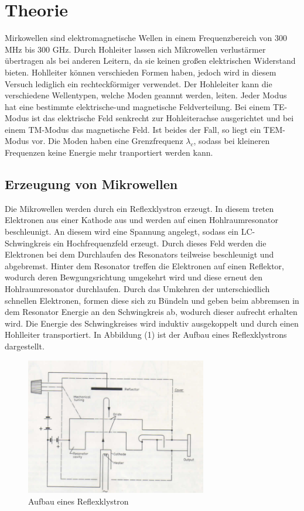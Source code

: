 \section{Theorie}
\label{sec:Theorie}
Mirkowellen sind elektromagnetische Wellen in einem Frequenzbereich von $300$ MHz bis 300 GHz. Durch
Hohleiter lassen sich Mikrowellen verlustärmer übertragen als bei anderen Leitern, da
sie keinen großen elektrischen Widerstand bieten. Hohlleiter können verschieden Formen haben,
jedoch wird in diesem Versuch lediglich ein rechteckförmiger verwendet. Der Hohleleiter
kann die verschiedene Wellentypen, welche Moden geannnt werden, leiten. Jeder Modus hat
eine bestimmte elektrische-und magnetische Feldverteilung. Bei einem TE-Modus ist das elektrische
Feld senkrecht zur Hohleiterachse ausgerichtet und bei einem TM-Modus das magnetische Feld.
Ist beides der Fall, so liegt ein TEM-Modus vor. Die Moden haben eine Grenzfrequenz $\lambda_c$, sodass
bei kleineren Frequenzen keine Energie mehr tranportiert werden kann.

\subsection{Erzeugung von Mikrowellen}
Die Mikrowellen werden durch ein Reflexklystron erzeugt. In diesem treten Elektronen
aus einer Kathode aus und werden auf einen Hohlraumresonator beschleunigt. An diesem
wird eine Spannung angelegt, sodass ein LC-Schwingkreis ein Hochfrequenzfeld erzeugt.
Durch dieses Feld werden die Elektronen  bei dem Durchlaufen des Resonators teilweise beschleunigt und abgebremst.
Hinter dem Resonator treffen die Elektronen auf einen Reflektor, wodurch deren
Bewgungsrichtung umgekehrt wird und diese erneut den Hohlraumresonator durchlaufen.
Durch das Umkehren der unterschiedlich schnellen Elektronen, formen diese sich zu Bündeln und
geben beim abbremsen in dem Resonator Energie an den Schwingkreis ab, wodurch dieser
aufrecht erhalten wird. Die Energie des Schwingkreises wird induktiv ausgekoppelt und
durch einen Hohlleiter transportiert. In Abbildung (1) ist der Aufbau
eines Reflexklystrons dargestellt.

\begin{figure}[H]
  \centering
  \includegraphics[height=6cm]{klystron.PNG}
  \caption{Aufbau eines Reflexklystron \cite{sample}}
  \label{fig:Lock}
\end{figure}

